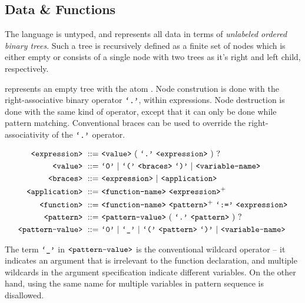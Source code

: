 \subsection{Data \& Functions}


The language  is untyped, and represents all data in terms of
\emph{unlabeled ordered binary trees}. Such a tree is recursively defined as
a finite set of nodes which is either empty or consists of a single node with
two trees as it's right and left child, respectively.

 represents an empty tree with the atom . Node constrution is
done with the right-associative binary operator $\text{{\ttfamily`.'}}$, within expressions.
Node destruction is done with the same kind of operator, except that it can
only be done while pattern matching. Conventional braces can be used to
override the right-associativity of the $\text{{\ttfamily`.'}}$ operator.

\begin{align}
\nonterm{expression}\ ::=&\ \nonterm{value}\ (\ \term{.}\ \nonterm{expression}
\ )\ ?\\
\nonterm{value}\ ::=&\ \term{0}\ |\ \term{(}\ \nonterm{braces}\ \term{)}\ |
\ \nonterm{variable-name}\\
\nonterm{braces}\ ::=&\ \nonterm{expression}\ |
\ \nonterm{application}\\
\nonterm{application}\ ::=&\ \nonterm{function-name}
\ \nonterm{expression}^+\\
\nonterm{function}\ ::=&\ \nonterm{function-name}\ \nonterm{pattern}^+
\ \term{:=}\ \nonterm{expression}\\
\nonterm{pattern}\ ::=&\ \nonterm{pattern-value}\ (\ \term{.}
\ \nonterm{pattern}\ )\ ?\\
\nonterm{pattern-value}\ ::=&\ \term{0}\ |\ \term{\_}\ |\ \term{(}
\ \nonterm{pattern}\ \term{)}\ |\ \nonterm{variable-name}
\end{align}

The term $\text{{\ttfamily`\_'}}$ in $\text{{\ttfamily<pattern-value>}}$ is the conventional wildcard
operator -- it indicates an argument that is irrelevant to the function
declaration, and multiple wildcards in the argument specification indicate
different variables. On the other hand, using the same name for multiple
variables in pattern sequence is disallowed.

